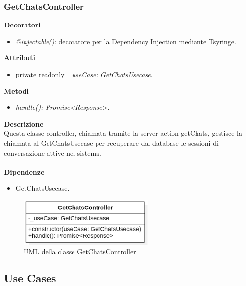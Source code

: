 \subsubsection{GetChatsController}
\textbf{Decoratori}
\begin{itemize}
    \item \textit{@injectable()}: decoratore per la Dependency Injection mediante Tsyringe.
\end{itemize}
\textbf{Attributi}
\begin{itemize}
    \item private readonly \textit{\_useCase: GetChatsUsecase}.
\end{itemize}
\textbf{Metodi}
\begin{itemize}
    \item \textit{handle(): Promise<Response}>.
\end{itemize}
\textbf{Descrizione}\\
Questa classe controller, chiamata tramite la server action getChats, gestisce la chiamata al GetChatsUsecase per recuperare dal database le sessioni di conversazione attive nel sistema.\\ \\
\textbf{Dipendenze}
\begin{itemize}
    \item GetChatsUsecase.
\end{itemize}

\begin{figure}[h!]
    \centering  
    \includegraphics[width=0.6\textwidth]{GetChatsController.png}
    \caption{UML della classe GetChatsController}
\end{figure}

\newpage

\subsection{Use Cases} \label{subsec:usecases}
